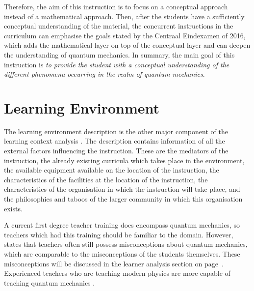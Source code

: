 \documentclass[11pt,twoside]{report} %
\begin{document}
Therefore, the aim of this instruction is to focus on a conceptual approach instead of a mathematical approach. Then, after the students have a sufficiently conceptual understanding of the material, the concurrent instructions in the curriculum can emphasise the goals stated by the Centraal Eindexamen of 2016, which adds the mathematical layer on top of the conceptual layer and can deepen the understanding of quantum mechanics. In summary, the main goal of this instruction is \emph{to provide the student with a conceptual understanding of the different phenomena occurring in the realm of quantum mechanics}.


\section{Learning Environment}
\label{sec:learningenvironment}

The learning environment description is the other major component of the learning context analysis \cite{smithragan}. The description contains information of all the external factors influencing the instruction. These are the mediators of the instruction, the already existing curricula which takes place in the environment, the available equipment available on the location of the instruction, the characteristics of the facilities at the location of the instruction, the characteristics of the organisation in which the instruction will take place, and the philosophies and taboos of the larger community in which this organisation exists.

A current first degree teacher training \cite{leraarnatuurkundemaster} does encompass quantum mechanics, so teachers which had this training should be familiar to the domain. However,  states that teachers often still possess misconceptions about quantum mechanics, which are comparable to the misconceptions of the students themselves. These misconceptions will be discussed in the learner analysis section on page~\pageref{ch:learneranalysis}. Experienced teachers who are teaching modern physics are more capable of teaching quantum mechanics \cite{asikainen}.
\end{document}
